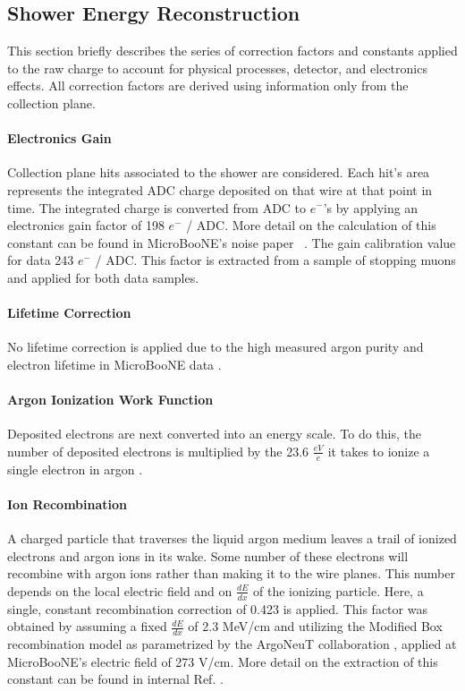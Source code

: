 \subsection{Shower Energy Reconstruction}
\label{sec:ereco}
\par This section briefly describes the series of correction factors and constants applied to the raw charge to account for physical processes, detector, and electronics effects. All correction factors are derived using information only from the collection plane. %

\paragraph{Electronics Gain} 
Collection plane hits associated to the shower are considered.  Each hit's area represents the integrated ADC charge deposited on that wire at that point in time.  The integrated charge is converted from ADC to $e^-$'s by applying an electronics gain factor of 198 $e^-$ / ADC. More detail on the calculation of this constant can be found in MicroBooNE's noise paper ~\cite{bib:noise}.  
\noindent The gain calibration value for data 243 $e^-$ / ADC.  This factor is extracted from a sample of stopping muons and applied for both data samples.   
\paragraph{ Lifetime Correction} No lifetime correction is applied due to the high measured argon purity and electron lifetime in MicroBooNE data \cite{bib:purity}. 
\paragraph{Argon Ionization Work Function} Deposited electrons are next converted into an energy scale. To do this, the number of deposited electrons is multiplied by the 23.6 $\frac{eV}{e}$ it takes to ionize a single electron in argon \cite{bib:ionization_per_electron}. 
\paragraph{Ion Recombination}  A charged particle that traverses the liquid argon medium leaves a trail of ionized electrons and argon ions in its wake.  Some number of these electrons will recombine with argon ions rather than making it to the wire planes. This number depends on the local electric field and on $\frac{dE}{dx}$ of the ionizing particle. Here, a single, constant recombination correction of 0.423 is applied. This factor was obtained by assuming a fixed $\frac{dE}{dx}$ of 2.3 MeV/cm and utilizing the Modified Box recombination model as parametrized by the ArgoNeuT collaboration \cite{bib:argoneut_recomb}, applied at MicroBooNE's electric field of 273 V/cm. More detail on the extraction of this constant can be found in internal Ref. \cite{bib:davidc_missingE}.
